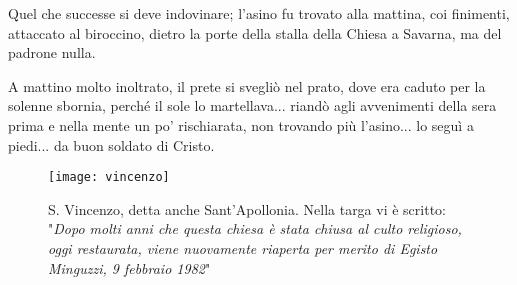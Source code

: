 Quel che successe si deve indovinare; l'asino fu trovato alla mattina, coi finimenti, attaccato al biroccino, dietro la porte della stalla della Chiesa a Savarna, ma del padrone nulla.

A mattino molto inoltrato, il prete si svegliò nel prato, dove era caduto per la solenne sbornia, perché il sole lo martellava... riandò agli avvenimenti della sera prima e nella mente un po' rischiarata, non trovando più l'asino... lo seguì a piedi... da buon soldato di Cristo.



 \begin{figure}[htb]
    \centering
    \texttt{[image: vincenzo]}
    \caption*{S. Vincenzo, detta anche Sant'Apollonia. Nella targa vi è scritto:\\ "\textit{Dopo molti anni che questa chiesa è stata chiusa al culto religioso, oggi restaurata, viene nuovamente riaperta per merito di Egisto Minguzzi, 9 febbraio 1982}"\label{fig:vincenzo}}
\end{figure}










































%

